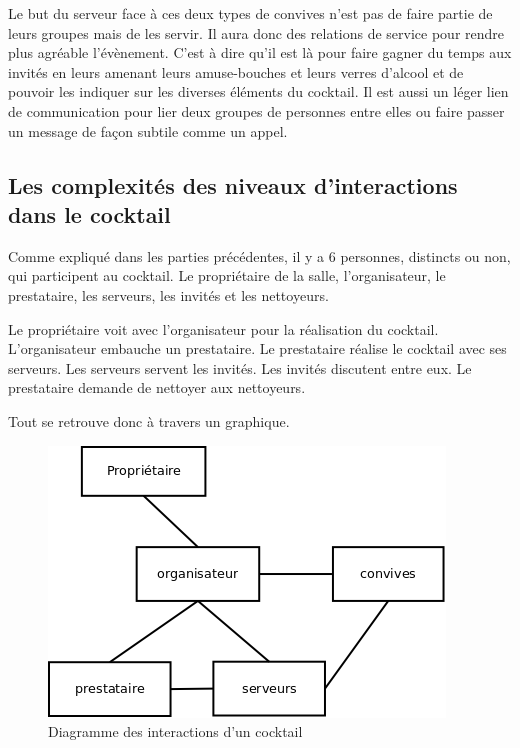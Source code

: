 Le but du serveur face à ces deux types de convives n’est pas de faire partie de leurs groupes mais de les servir. Il aura donc des relations de service pour rendre plus agréable l’évènement. C’est à dire qu’il est là pour faire gagner du temps aux invités en leurs amenant leurs amuse-bouches et leurs verres d’alcool et de pouvoir les indiquer sur les diverses éléments du cocktail. Il est aussi un léger lien de communication pour lier deux groupes de personnes entre elles ou faire passer un message de façon subtile comme un appel. 


\subsection{Les complexités des niveaux d'interactions dans le cocktail}

Comme expliqué dans les parties précédentes, il y a 6 personnes, distincts ou non, qui participent au cocktail. Le propriétaire de la salle, l’organisateur, le prestataire, les serveurs, les invités et les nettoyeurs.

Le propriétaire voit avec l’organisateur pour la réalisation du cocktail. L’organisateur embauche un prestataire. Le prestataire réalise le cocktail avec ses serveurs. Les serveurs servent les invités. Les invités discutent entre eux. Le prestataire demande de nettoyer aux nettoyeurs.

Tout se retrouve donc à travers un graphique.

\begin{figure}[h]
\begin{center}
\includegraphics[scale=0.55]{Images/interaction_cocktail.png}
\caption{Diagramme des interactions d'un cocktail}
\label{Diagramme des interactions d'un cocktail}
\end{center}
\end{figure}


